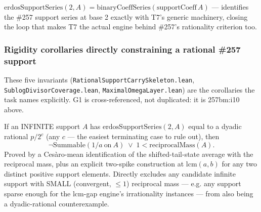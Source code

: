 \begin{thm}
$\mathrm{erdosSupportSeries}(2,A) = \mathrm{binaryCoeffSeries}(\mathrm{supportCoeff}\,A)$ —
identifies the \#257 support series at base 2 exactly with T7's generic machinery, closing the
loop that makes T7 the actual engine behind \#257's rationality criterion too.
\par\noindent{}    
\end{thm}

\subsubsection*{Rigidity corollaries directly constraining a rational \#257 support}

These five invariants (\texttt{RationalSupportCarrySkeleton.lean}, \texttt{SublogDivisorCoverage.lean}, \texttt{MaximalOmegaLayer.lean}) are the corollaries the task names explicitly. G1 is cross-referenced, not duplicated: it is 257bm:i10 above.

\begin{thm}
If an INFINITE support $A$ has $\mathrm{erdosSupportSeries}(2,A)$ equal to a dyadic rational
$p/2^c$ (any $c$ — the easiest terminating case to rule out), then
\[
\neg\mathrm{Summable}(1/a\ \text{on}\ A) \;\vee\; 1 < \mathrm{reciprocalMass}(A).
\]
Proved by a Ces\`aro-mean identification of the shifted-tail-state average with the reciprocal
mass, plus an explicit two-spike construction at $\mathrm{lcm}(a,b)$ for any two distinct
positive support elements. Directly excludes any candidate infinite support with SMALL
(convergent, $\le1$) reciprocal mass — e.g. any support sparse enough for the lcm-gap engine's
irrationality instances — from also being a dyadic-rational counterexample.
\par\noindent{}    
\end{thm}

